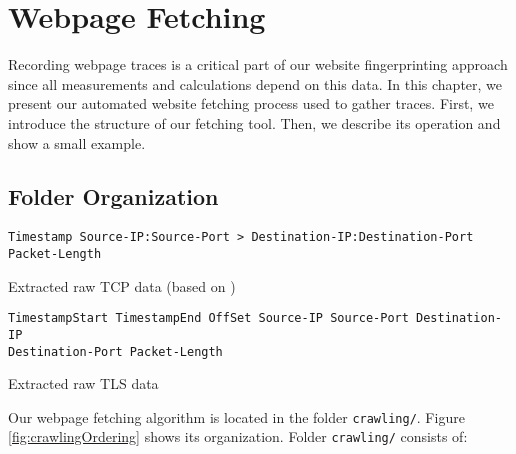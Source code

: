 \chapter{Webpage Fetching}
\label{chap:webpage_fetching}

Recording webpage traces is a critical part of our website fingerprinting approach since all measurements and calculations depend on this data. In this chapter, we present our automated website fetching process used to gather traces. First, we introduce the structure of our fetching tool. Then, we describe its operation and show a small example.

\section{Folder Organization}
\label{sec:fetching_folder}

\begin{listing}[t]
\begin{lstlisting}[basicstyle=\scriptsize\ttfamily,numbers=none]
Timestamp Source-IP:Source-Port > Destination-IP:Destination-Port Packet-Length
\end{lstlisting}
\caption{Extracted raw \ac{TCP} data (based on \cite{Pennekamp2014})}
\label{lst:tcprawdata}
\end{listing}

\begin{listing}[t]
\begin{lstlisting}[basicstyle=\scriptsize\ttfamily,numbers=none]
TimestampStart TimestampEnd OffSet Source-IP Source-Port Destination-IP
Destination-Port Packet-Length
\end{lstlisting}
\caption{Extracted raw \ac{TLS} data}
\label{lst:tlsrawdata}
\end{listing}

Our webpage fetching algorithm is located in the folder \texttt{crawling/}. Figure \ref{fig:crawlingOrdering} shows its organization. Folder \texttt{crawling/} consists of:


